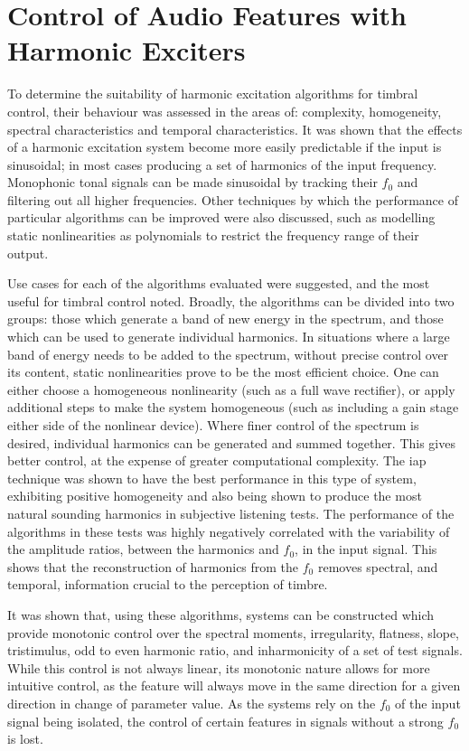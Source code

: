 \section{Control of Audio Features with Harmonic Exciters}
\label{sec:Conclusion-FeatureConrol}
	To determine the suitability of harmonic excitation algorithms for timbral control, their behaviour was assessed in
	the areas of: complexity, homogeneity, spectral characteristics and temporal characteristics. It was shown that the
	effects of a harmonic excitation system become more easily predictable if the input is sinusoidal; in most cases
	producing a set of harmonics of the input frequency. Monophonic tonal signals can be made sinusoidal by tracking
	their $f_{0}$ and filtering out all higher frequencies. Other techniques by which the performance of particular
	algorithms can be improved were also discussed, such as modelling static nonlinearities as polynomials to restrict
	the frequency range of their output.
	
	Use cases for each of the algorithms evaluated were suggested, and the most useful for timbral control noted.
	Broadly, the algorithms can be divided into two groups: those which generate a band of new energy in the spectrum,
	and those which can be used to generate individual harmonics. In situations where a large band of energy needs to be
	added to the spectrum, without precise control over its content, static nonlinearities prove to be the most
	efficient choice. One can either choose a homogeneous nonlinearity (such as a full wave rectifier), or apply
	additional steps to make the system homogeneous (such as including a gain stage either side of the nonlinear
	device). Where finer control of the spectrum is desired, individual harmonics can be generated and summed together.
	This gives better control, at the expense of greater computational complexity. The \acrshort{iap} technique was
	shown to have the best performance in this type of system, exhibiting positive homogeneity and also being shown to
	produce the most natural sounding harmonics in subjective listening tests. The performance of the algorithms in
	these tests was highly negatively correlated with the variability of the amplitude ratios, between the harmonics and
	$f_{0}$, in the input signal. This shows that the reconstruction of harmonics from the $f_{0}$ removes spectral, and
	temporal, information crucial to the perception of timbre.

	It was shown that, using these algorithms, systems can be constructed which provide monotonic control over the
	spectral moments, irregularity, flatness, slope, tristimulus, odd to even harmonic ratio, and inharmonicity of a set
	of test signals. While this control is not always linear, its monotonic nature allows for more intuitive control, as
	the feature will always move in the same direction for a given direction in change of parameter value. As the
	systems rely on the $f_{0}$ of the input signal being isolated, the control of certain features in signals without a
	strong $f_{0}$ is lost. 

